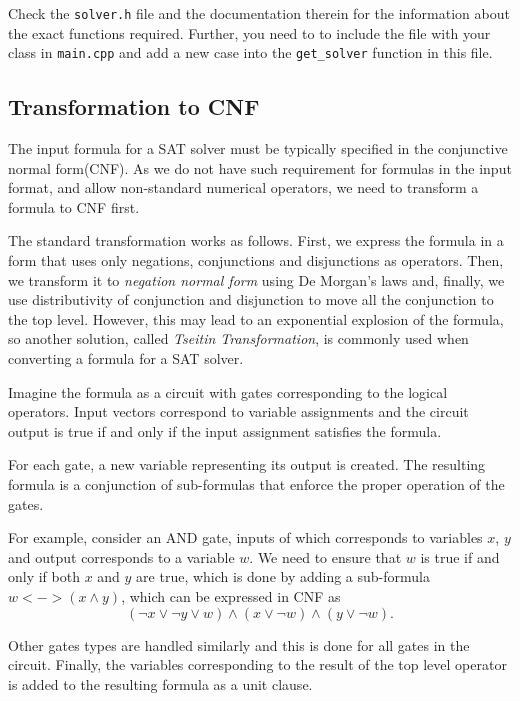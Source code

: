 Check the \texttt{solver.h} file and the documentation therein
  for the information about the exact functions required.
Further, you need to to include the file with your class in
  \texttt{main.cpp} and add a new case
  into the \texttt{get\_solver} function in this file.

\subsection{Transformation to CNF}

The input formula for a SAT solver must be typically specified
  in the conjunctive normal form(CNF).
As we do not have such requirement for formulas in the input format,
  and allow non-standard numerical operators,
  we need to transform a formula to CNF first.

The standard transformation works as follows.
First, we express the formula in a form
  that uses only negations, conjunctions and disjunctions as operators.
Then, we transform it to \emph{negation normal form} using De Morgan's laws
  and, finally, we use distributivity of conjunction and disjunction to
  move all the conjunction to the top level.
However, this may lead to an exponential explosion of the formula, so
another solution, called \emph{Tseitin Transformation}, is commonly used
  when converting a formula for a SAT solver\cite{tseitin}.

Imagine the formula as a circuit with gates corresponding to the logical operators.
Input vectors correspond to variable assignments and the circuit output
  is true if and only if the input assignment satisfies the formula.

For each gate, a new variable representing its output is created.
The resulting formula is a conjunction of sub-formulas that enforce
  the proper operation of the gates.

For example, consider an AND gate, inputs of which corresponds to variables
  $x$, $y$ and output corresponds to a variable $w$.
We need to ensure that $w$ is true if and only if both $x$ and $y$ are true,
  which is done by adding a sub-formula $w <-> (x \wedge y)$, which can be
  expressed in CNF as
\[
(\neg x \vee \neg y \vee w) \wedge
(x \vee \neg w) \wedge
(y \vee \neg w).
\]

Other gates types are handled similarly and this is done for all gates in the circuit.
Finally, the variables
  corresponding to the result of the top level operator is added
  to the resulting formula as a unit clause.


